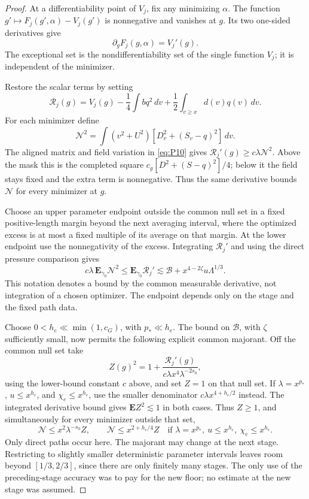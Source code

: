 \begin{proof}
At a differentiability point of \(V_j\), fix any minimizing
\(\alpha\). The function
\(g'\mapsto F_j(g',\alpha)-V_j(g')\) is nonnegative and vanishes
at \(g\). Its two one-sided derivatives give
\[
 \partial_gF_j(g,\alpha)=V_j'(g).
\]
The exceptional set is the nondifferentiability set of the single
function \(V_j\); it is independent of the minimizer.

Restore the scalar terms by setting
\[
 \mathcal R_j(g)=V_j(g)-\frac14\int bq^2\,dv
                      +\frac12\int_{v\ge x}d(v)q(v)\,dv .
\]
For each minimizer define
\[
 \mathcal N^2=\int(v^2+U^2)
                    [D_v^2+(S_v-q)^2]\,dv.
\]
The aligned matrix and field variation in \eqref{eq:P10} gives
\(\mathcal R_j'(g)\ge c\lambda\mathcal N^2\).
Above the mask this is the completed square
\(c_g[D^2+(S-q)^2]/4\); below it the field stays fixed and the
extra term is nonnegative. Thus the same derivative bounds
\(\mathcal N\) for every minimizer at \(g\).

Choose an upper parameter endpoint outside the common null set in a fixed positive-length margin
beyond the next averaging interval, where the optimized excess is at
most a fixed multiple of its average on that margin. At the lower
endpoint use the nonnegativity of the excess. Integrating
\(\mathcal R_j'\) and using the direct pressure comparison gives
\[
 c\lambda\,\mathbf E_{\gamma_0}\mathcal N^2
 \le\mathbf E_{\gamma_0}\mathcal R_j'
 \lesssim\mathcal B+x^{4-2\zeta}u\Lambda^{1/3}.
\]
This notation denotes a bound by the common measurable derivative,
not integration of a chosen optimizer. The endpoint depends only on
the stage and the fixed path data.

Choose \(0<h_e\ll\min(1,c_G)\), with \(p_*\ll h_e\).
The bound on \(\mathcal B\), with \(\zeta\) sufficiently small,
now permits the following explicit common majorant. Off the common null
set take
\[
 Z(g)^2=1+\frac{\mathcal R_j'(g)}
                    {c\lambda x^4\lambda^{-2s_0}},
\]
using the lower-bound constant \(c\) above, and set \(Z=1\) on
that null set. If \(\lambda=x^{p_*}\), \(u\le x^{h_e}\), and
\(\chi_e\le x^{h_e}\), use the smaller denominator
\(c\lambda x^{4+h_e/2}\) instead. The integrated derivative bound
gives \(\mathbf E Z^2\lesssim1\) in both cases. Thus \(Z\ge1\),
and
simultaneously for every minimizer outside that set,
\[
 \mathcal N\le x^2\lambda^{-s_0}Z,\qquad
 \mathcal N\le x^{2+h_e/4}Z
 \quad\text{if }\lambda=x^{p_*},\ u\le x^{h_e},\ \chi_e\le x^{h_e}.
 \tag{C13}\label{eq:C13}
\]
Only direct paths occur here. The majorant may change at the next
stage. Restricting to slightly smaller deterministic parameter intervals
leaves room beyond \([1/3,2/3]\), since there are only finitely many
stages. The only use of the preceding-stage accuracy was to pay for
the new floor; no estimate at the new stage was assumed.

\end{proof}



